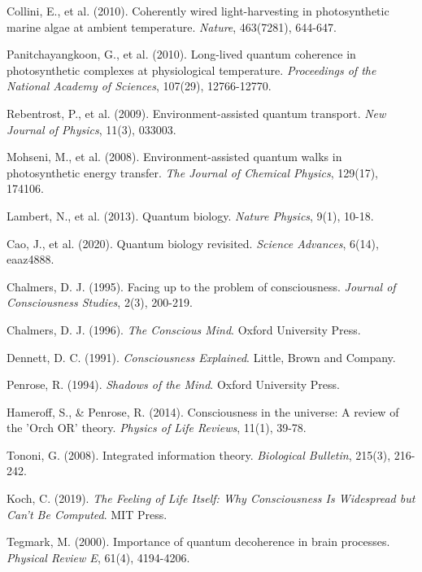 \documentclass[12pt,a4paper]{article}
\begin{document}
\begin{thebibliography}{99}
Collini, E., et al. (2010). Coherently wired light-harvesting in photosynthetic marine algae at ambient temperature. \textit{Nature}, 463(7281), 644-647.

Panitchayangkoon, G., et al. (2010). Long-lived quantum coherence in photosynthetic complexes at physiological temperature. \textit{Proceedings of the National Academy of Sciences}, 107(29), 12766-12770.

Rebentrost, P., et al. (2009). Environment-assisted quantum transport. \textit{New Journal of Physics}, 11(3), 033003.

Mohseni, M., et al. (2008). Environment-assisted quantum walks in photosynthetic energy transfer. \textit{The Journal of Chemical Physics}, 129(17), 174106.

Lambert, N., et al. (2013). Quantum biology. \textit{Nature Physics}, 9(1), 10-18.

Cao, J., et al. (2020). Quantum biology revisited. \textit{Science Advances}, 6(14), eaaz4888.

Chalmers, D. J. (1995). Facing up to the problem of consciousness. \textit{Journal of Consciousness Studies}, 2(3), 200-219.

Chalmers, D. J. (1996). \textit{The Conscious Mind}. Oxford University Press.

Dennett, D. C. (1991). \textit{Consciousness Explained}. Little, Brown and Company.

Penrose, R. (1994). \textit{Shadows of the Mind}. Oxford University Press.

Hameroff, S., \& Penrose, R. (2014). Consciousness in the universe: A review of the 'Orch OR' theory. \textit{Physics of Life Reviews}, 11(1), 39-78.

Tononi, G. (2008). Integrated information theory. \textit{Biological Bulletin}, 215(3), 216-242.

Koch, C. (2019). \textit{The Feeling of Life Itself: Why Consciousness Is Widespread but Can't Be Computed}. MIT Press.

Tegmark, M. (2000). Importance of quantum decoherence in brain processes. \textit{Physical Review E}, 61(4), 4194-4206.


\end{thebibliography}
\end{document}
